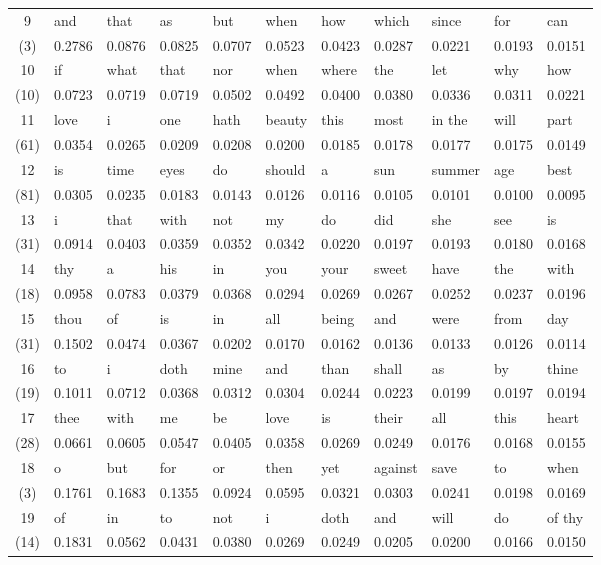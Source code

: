 \begin{table}[h!]
\begin{tabular}{c||l|l|l|l|l|l|l|l|l|l}
		9 & and & that & as & but & when & how & which & since & for & can \\
		(3) & 0.2786 & 0.0876 & 0.0825 & 0.0707 & 0.0523 & 0.0423 & 0.0287 & 0.0221 & 0.0193 & 0.0151 \\ \hline
		10 & if & what & that & nor & when & where & the & let & why & how \\
		(10) & 0.0723 & 0.0719 & 0.0719 & 0.0502 & 0.0492 & 0.0400 & 0.0380 & 0.0336 & 0.0311 & 0.0221 \\ \hline
		11 & love & i & one & hath & beauty & this & most & in the & will & part \\
		(61) & 0.0354 & 0.0265 & 0.0209 & 0.0208 & 0.0200 & 0.0185 & 0.0178 & 0.0177 & 0.0175 & 0.0149 \\ \hline
		12 & is & time & eyes & do & should & a & sun & summer & age & best \\
		(81) & 0.0305 & 0.0235 & 0.0183 & 0.0143 & 0.0126 & 0.0116 & 0.0105 & 0.0101 & 0.0100 & 0.0095 \\ \hline
		13 & i & that & with & not & my & do & did & she & see & is \\
		(31) & 0.0914 & 0.0403 & 0.0359 & 0.0352 & 0.0342 & 0.0220 & 0.0197 & 0.0193 & 0.0180 & 0.0168 \\ \hline
		14 & thy & a & his & in & you & your & sweet & have & the & with \\
		(18) & 0.0958 & 0.0783 & 0.0379 & 0.0368 & 0.0294 & 0.0269 & 0.0267 & 0.0252 & 0.0237 & 0.0196 \\ \hline
		15 & thou & of & is & in & all & being & and & were & from & day \\
		(31) & 0.1502 & 0.0474 & 0.0367 & 0.0202 & 0.0170 & 0.0162 & 0.0136 & 0.0133 & 0.0126 & 0.0114 \\ \hline
		16 & to & i & doth & mine & and & than & shall & as & by & thine \\
		(19) & 0.1011 & 0.0712 & 0.0368 & 0.0312 & 0.0304 & 0.0244 & 0.0223 & 0.0199 & 0.0197 & 0.0194 \\ \hline
		17 & thee & with & me & be & love & is & their & all & this & heart \\
		(28) & 0.0661 & 0.0605 & 0.0547 & 0.0405 & 0.0358 & 0.0269 & 0.0249 & 0.0176 & 0.0168 & 0.0155 \\ \hline
		18 & o & but & for & or & then & yet & against & save & to & when \\
		(3) & 0.1761 & 0.1683 & 0.1355 & 0.0924 & 0.0595 & 0.0321 & 0.0303 & 0.0241 & 0.0198 & 0.0169 \\ \hline
		19 & of & in & to & not & i & doth & and & will & do & of thy \\
		(14) & 0.1831 & 0.0562 & 0.0431 & 0.0380 & 0.0269 & 0.0249 & 0.0205 & 0.0200 & 0.0166 & 0.0150 \\ \hline
	\end{tabular}
\end{table}

